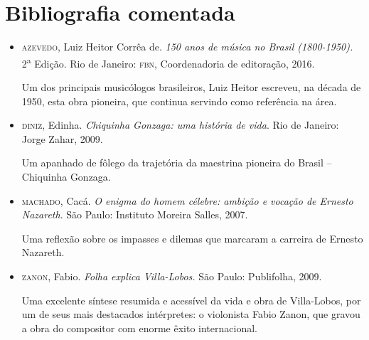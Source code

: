 \documentclass[11pt]{extarticle}
\begin{document}
\section{Bibliografia comentada}

\begin{itemize}

\item 
\textsc{azevedo}, Luiz Heitor Corrêa de. \emph{150 anos de música no Brasil
(1800-1950).} 2\textsuperscript{a} Edição. Rio de Janeiro: \textsc{fbn},
Coordenadoria de editoração, 2016.


Um dos principais musicólogos brasileiros, Luiz Heitor escreveu,
na década de 1950, esta obra pioneira, que continua servindo como
referência na área.

\item 
\textsc{diniz}, Edinha. \emph{Chiquinha Gonzaga: uma história de vida}. Rio de
Janeiro: Jorge Zahar, 2009.

Um apanhado de fôlego da trajetória da maestrina pioneira do
Brasil -- Chiquinha Gonzaga.

\item 
\textsc{machado}, Cacá. \emph{O enigma do homem célebre: ambição e vocação de
Ernesto Nazareth}. São Paulo: Instituto Moreira Salles, 2007.

Uma reflexão sobre os impasses e dilemas que marcaram a carreira
de Ernesto Nazareth.

\item 
\textsc{zanon}, Fabio. \emph{Folha explica Villa-Lobos.} São Paulo: Publifolha,
2009.

Uma excelente síntese resumida e acessível da vida e obra de
Villa-Lobos, por um de seus mais destacados intérpretes: o violonista
Fabio Zanon, que gravou a obra do compositor com enorme êxito
internacional.
\end{itemize}
\end{document}
